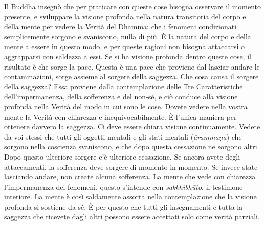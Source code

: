 Il Buddha insegnò che per praticare con queste cose bisogna osservare il
momento presente, e sviluppare la visione profonda nella natura
transitoria del corpo e della mente per vedere la Verità del Dhamma: che
i fenomeni condizionati semplicemente sorgono e svaniscono, nulla di
più. È la natura del corpo e della mente a essere in questo modo, e per
queste ragioni non bisogna attaccarsi o aggrapparsi con saldezza a essi.
Se si ha visione profonda dentro queste cose, il risultato è che sorge
la pace. Questa è una pace che proviene dal lasciar andare le
contaminazioni, sorge assieme al sorgere della saggezza. Che cosa causa
il sorgere della saggezza? Essa proviene dalla contemplazione delle Tre
Caratteristiche dell'impermanenza, della sofferenza e del non-sé, e ciò
conduce alla visione profonda nella Verità del modo in cui sono le cose.
Dovete vedere nella vostra mente la Verità con chiarezza e
inequivocabilmente. È l'unica maniera per ottenere davvero la saggezza.
Ci deve essere chiara visione continuamente. Vedete da voi stessi che
tutti gli oggetti mentali e gli stati mentali (\emph{ārammaṇa}) che
sorgono nella coscienza svaniscono, e che dopo questa cessazione ne
sorgono altri. Dopo questo ulteriore sorgere c'è ulteriore cessazione.
Se ancora avete degli attaccamenti, la sofferenza deve sorgere di
momento in momento. Se invece state lasciando andare, non create alcuna
sofferenza. La mente che vede con chiarezza l'impermanenza dei fenomeni,
questo s'intende con \emph{sakkhibhūto}, il testimone interiore. La
mente è così saldamente assorta nella contemplazione che la visione
profonda si sostiene da sé. È per questo che tutti gli insegnamenti e
tutta la saggezza che ricevete dagli altri possono essere accettati solo
come verità parziali.

